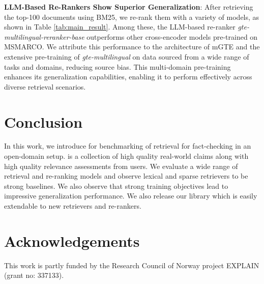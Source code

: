 \textbf{LLM-Based Re-Rankers Show Superior Generalization}: After retrieving the top-100 documents using BM25, we re-rank them with a variety of models, as shown in Table \ref{tab:main_result}. Among these, the LLM-based re-ranker \textit{gte-multilingual-reranker-base} outperforms other cross-encoder models pre-trained on MSMARCO. We attribute this performance to the architecture of mGTE and the extensive pre-training of \textit{gte-multilingual} \cite{zhang-etal-2024-mgte} on data sourced from a wide range of tasks and domains, reducing source bias. This multi-domain pre-training enhances its generalization capabilities, enabling it to perform effectively across diverse retrieval scenarios.

\vspace{-1em}
\section{Conclusion}
In this work, we introduce \name{} for benchmarking of retrieval for fact-checking in an open-domain setup. \name{} is a collection of high quality real-world claims along with high quality relevance assessments from users. We evaluate a wide range of retrieval and re-ranking models and observe lexical and sparse retrievers to be strong baselines. We also observe that strong training objectives lead to impressive generalization performance. We also release our library which is easily extendable to new retrievers and re-rankers.
\section{Acknowledgements}
This work is partly funded by the Research Council of Norway project EXPLAIN (grant no:
337133).